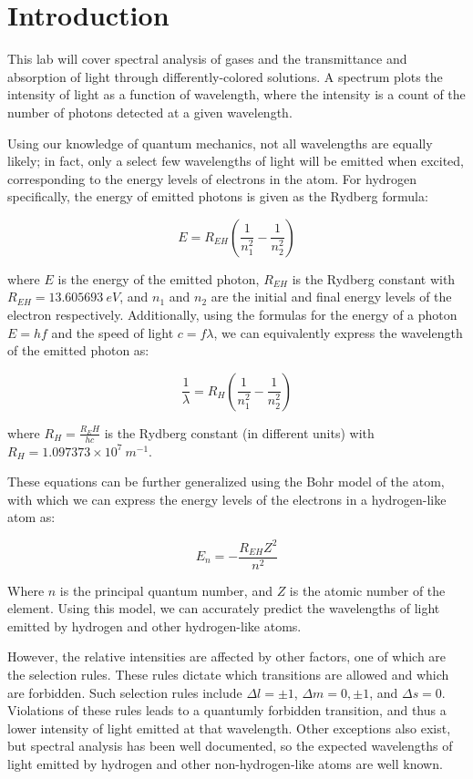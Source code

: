 \section{Introduction}
This lab will cover spectral analysis of gases and the transmittance and absorption of light through differently-colored solutions. A spectrum plots the intensity of light as a function of wavelength, where the intensity is a count of the number of photons detected at a given wavelength.

Using our knowledge of quantum mechanics, not all wavelengths are equally likely; in fact, only a select few wavelengths of light will be emitted when excited, corresponding to the energy levels of electrons in the atom. For hydrogen specifically, the energy of emitted photons is given as the Rydberg formula:

\begin{equation}
   E = R_{EH} \left( \frac{1}{n_1^2} - \frac{1}{n_2^2} \right)
\end{equation}

where $E$ is the energy of the emitted photon, $R_{EH}$ is the Rydberg constant with $R_{EH} = 13.605693~eV$, and $n_1$ and $n_2$ are the initial and final energy levels of the electron respectively. Additionally, using the formulas for the energy of a photon $E = hf$ and the speed of light $c = f\lambda$, we can equivalently express the wavelength of the emitted photon as:

\begin{equation}
   \frac{1}{\lambda} = R_{H} \left( \frac{1}{n_1^2} - \frac{1}{n_2^2} \right)
\end{equation}

where $R_{H}=\frac{R_EH}{hc}$ is the Rydberg constant (in different units) with $R_{H} = 1.097373 \times 10^7~m^{-1}$. 

These equations can be further generalized using the Bohr model of the atom, with which we can express the energy levels of the electrons in a hydrogen-like atom as:

\begin{equation}
   E_n = -\frac{R_{EH}Z^2}{n^2}
\end{equation}

Where $n$ is the principal quantum number, and $Z$ is the atomic number of the element. Using this model, we can accurately predict the wavelengths of light emitted by hydrogen and other hydrogen-like atoms.

However, the relative intensities are affected by other factors, one of which are the selection rules. These rules dictate which transitions are allowed and which are forbidden. Such selection rules include $\Delta l = \pm 1$, $\Delta m = 0, \pm 1$, and $\Delta s = 0$. Violations of these rules leads to a quantumly forbidden transition, and thus a lower intensity of light emitted at that wavelength. Other exceptions also exist, but spectral analysis has been well documented, so the expected wavelengths of light emitted by hydrogen and other non-hydrogen-like atoms are well known.

